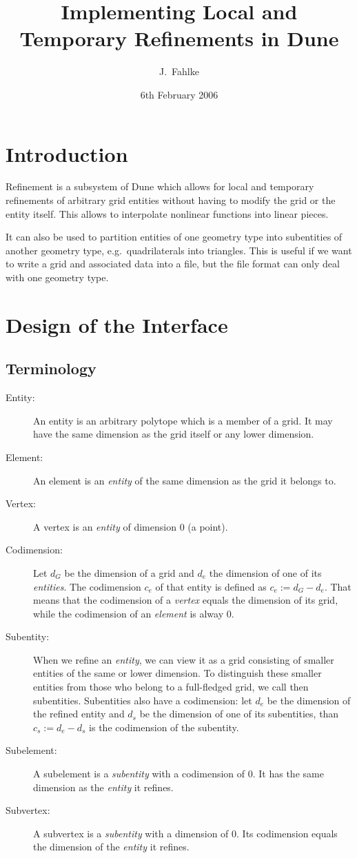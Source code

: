 \documentclass[english,a4paper]{article}
\author{J.~Fahlke}
\title{Implementing Local and Temporary Refinements in Dune}
\date{6th February 2006}
\begin{document}
\maketitle

\section{Introduction}

Refinement is a subsystem of Dune\cite{dune} which allows for local
and temporary refinements of arbitrary grid entities without having to
modify the grid or the entity itself.  This allows to interpolate
nonlinear functions into linear pieces.

It can also be used to partition entities of one geometry type into
subentities of another geometry type, e.g.\ quadrilaterals into
triangles.  This is useful if we want to write a grid and associated
data into a file, but the file format can only deal with one geometry
type.

\section{Design of the Interface}

\subsection{Terminology}

\begin{description}
\item[Entity:] An entity is an arbitrary polytope which is a member of
  a grid.  It may have the same dimension as the grid itself or any
  lower dimension.
\item[Element:] An element is an {\em entity} of the same dimension as
  the grid it belongs to.
\item[Vertex:] A vertex is an {\em entity} of dimension 0 (a point).
\item[Codimension:] Let $d_G$ be the dimension of a grid and $d_e$ the
  dimension of one of its {\em entities}.  The codimension $c_e$ of that
  entity is defined as $c_e:=d_G-d_e$.  That means that the
  codimension of a {\em vertex} equals the dimension of its grid,
  while the codimension of an {\em element} is alway 0.
\item[Subentity:] When we refine an {\em entity}, we can view it as a
  grid consisting of smaller entities of the same or lower dimension.
  To distinguish these smaller entities from those who belong to a
  full-fledged grid, we call then subentities.  Subentities also have
  a codimension: let $d_e$ be the dimension of the refined entity and
  $d_s$ be the dimension of one of its subentities, than $c_s:=d_e-d_s$
  is the codimension of the subentity.
\item[Subelement:] A subelement is a {\em subentity} with a
  codimension of 0.  It has the same dimension as the {\em entity} it
  refines.
\item[Subvertex:] A subvertex is a {\em subentity} with a dimension of
  0.  Its codimension equals the dimension of the {\em entity} it
  refines.
\end{description}
\end{document}
